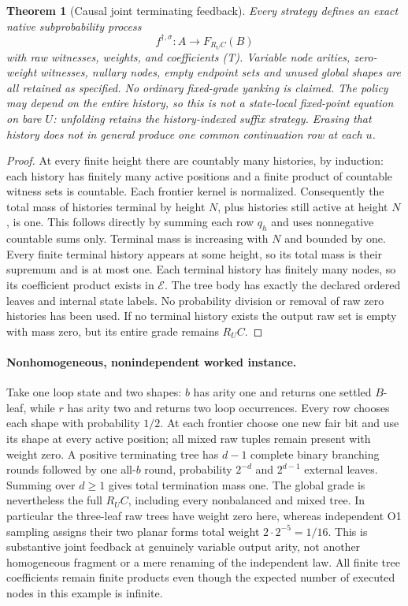 \documentclass[11pt]{article}
\newtheorem{theorem}{Theorem}
\newcommand{\E}{\mathcal E}
\begin{document}
\begin{theorem}[Causal joint terminating feedback]
Every strategy defines an exact native subprobability process
\[
 f^{\dagger,\sigma}:A\longrightarrow F_{R_U C}(B)
\]
with raw witnesses, weights, and coefficients (T). Variable node arities, zero-weight witnesses, nullary nodes, empty endpoint sets and unused global shapes are all retained as specified. No ordinary fixed-grade yanking is claimed. The policy may depend on the entire history, so this is not a state-local fixed-point equation on bare $U$: unfolding retains the history-indexed suffix strategy. Erasing that history does not in general produce one common continuation row at each $u$.
\end{theorem}
\begin{proof}
At every finite height there are countably many histories, by induction: each history has finitely many active positions and a finite product of countable witness sets is countable. Each frontier kernel is normalized. Consequently the total mass of histories terminal by height $N$, plus histories still active at height $N$, is one. This follows directly by summing each row $q_h$ and uses nonnegative countable sums only. Terminal mass is increasing with $N$ and bounded by one. Every finite terminal history appears at some height, so its total mass is their supremum and is at most one. Each terminal history has finitely many nodes, so its coefficient product exists in $\E$. The tree body has exactly the declared ordered leaves and internal state labels. No probability division or removal of raw zero histories has been used. If no terminal history exists the output raw set is empty with mass zero, but its entire grade remains $R_U C$.
\end{proof}

\paragraph{Nonhomogeneous, nonindependent worked instance.}
Take one loop state and two shapes: $b$ has arity one and returns one settled $B$-leaf, while $r$ has arity two and returns two loop occurrences. Every row chooses each shape with probability $1/2$. At each frontier choose one new fair bit and use its shape at every active position; all mixed raw tuples remain present with weight zero. A positive terminating tree has $d-1$ complete binary branching rounds followed by one all-$b$ round, probability $2^{-d}$ and $2^{d-1}$ external leaves. Summing over $d\geq1$ gives total termination mass one. The global grade is nevertheless the full $R_U C$, including every nonbalanced and mixed tree. In particular the three-leaf raw trees have weight zero here, whereas independent O1 sampling assigns their two planar forms total weight $2\cdot2^{-5}=1/16$. This is substantive joint feedback at genuinely variable output arity, not another homogeneous fragment or a mere renaming of the independent law. All finite tree coefficients remain finite products even though the expected number of executed nodes in this example is infinite.
\end{document}
